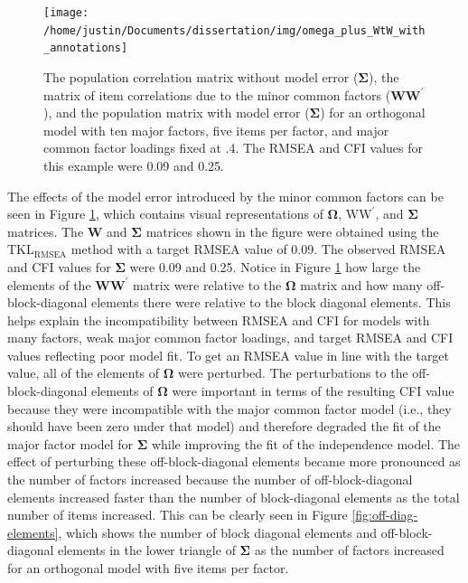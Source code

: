 \documentclass[11pt]{umnthesis}
\begin{document}
\begin{figure}

{\centering \texttt{[image: /home/justin/Documents/dissertation/img/omega\_plus\_WtW\_with\_annotations]} 

}

\caption[The population correlation matrix without model error ($\bm{\Sigma}$), the matrix of item correlations due to the minor common factors ($\mathbf{WW}^\prime$), and the population matrix with model error ($\bm{\Sigma}$) for an orthogonal model with ten major factors, five items per factor, and major common factor loadings fixed at .4]{The population correlation matrix without model error ($\bm{\Sigma}$), the matrix of item correlations due to the minor common factors ($\mathbf{WW}^\prime$), and the population matrix with model error ($\bm{\Sigma}$) for an orthogonal model with ten major factors, five items per factor, and major common factor loadings fixed at .4. The RMSEA and CFI values for this example were 0.09 and 0.25.}\label{fig:omega-wtw-sigma-example}
\end{figure}

The effects of the model error introduced by the minor common factors can be seen in Figure \ref{fig:omega-wtw-sigma-example}, which contains visual representations of \(\bm{\Omega}\), \(\textrm{WW}^\prime\), and \(\bm{\Sigma}\) matrices. The \(\mathbf{W}\) and \(\bm{\Sigma}\) matrices shown in the figure were obtained using the \(\textrm{TKL}_{\textrm{RMSEA}}\) method with a target RMSEA value of 0.09. The observed RMSEA and CFI values for \(\bm{\Sigma}\) were 0.09 and 0.25. Notice in Figure \ref{fig:omega-wtw-sigma-example} how large the elements of the \(\mathbf{WW}^\prime\) matrix were relative to the \(\bm{\Omega}\) matrix and how many off-block-diagonal elements there were relative to the block diagonal elements. This helps explain the incompatibility between RMSEA and CFI for models with many factors, weak major common factor loadings, and target RMSEA and CFI values reflecting poor model fit. To get an RMSEA value in line with the target value, all of the elements of \(\bm{\Omega}\) were perturbed. The perturbations to the off-block-diagonal elements of \(\bm{\Omega}\) were important in terms of the resulting CFI value because they were incompatible with the major common factor model (i.e., they should have been zero under that model) and therefore degraded the fit of the major factor model for \(\bm{\Sigma}\) while improving the fit of the independence model. The effect of perturbing these off-block-diagonal elements became more pronounced as the number of factors increased because the number of off-block-diagonal elements increased faster than the number of block-diagonal elements as the total number of items increased. This can be clearly seen in Figure \ref{fig:off-diag-elements}, which shows the number of block diagonal elements and off-block-diagonal elements in the lower triangle of \(\bm{\Sigma}\) as the number of factors increased for an orthogonal model with five items per factor.
\end{document}
